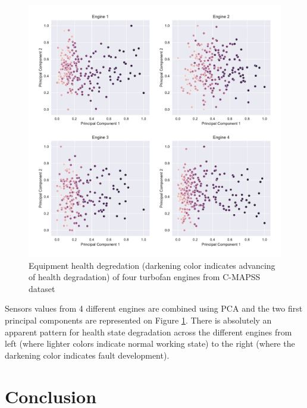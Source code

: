 \begin{figure}[h]
    \centering
    \includegraphics[width=.9\linewidth]{figures/plots/pc-degradation.pdf}
    \caption{Equipment health degredation (darkening color indicates advancing of health degradation) of four turbofan engines from C-MAPSS dataset}
    \label{fig:pca-degradation}
\end{figure}

Sensors values from 4 different engines are combined using PCA and the two first principal components are represented on Figure \ref{fig:pca-degradation}. There is absolutely an apparent pattern for health state degradation across the different engines from left (where lighter colors indicate normal working state) to the right (where the darkening color indicates fault development).

\section{Conclusion}
